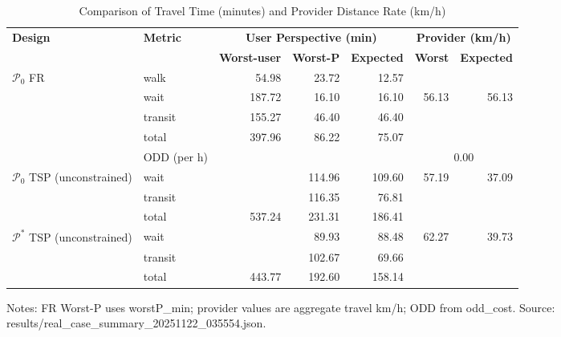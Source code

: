 \begin{table}[t]
\centering
\caption{Comparison of Travel Time (minutes) and Provider Distance Rate (km/h)}
\begin{tabular}{l l r r r r r}
\toprule
\textbf{Design} & \textbf{Metric} & 
\multicolumn{3}{c}{\textbf{User Perspective (min)}} & 
\multicolumn{2}{c}{\textbf{Provider (km/h)}} \\
\cmidrule(lr){3-5}\cmidrule(lr){6-7}
& & \textbf{Worst-user} & \textbf{Worst-P} & \textbf{Expected} & \textbf{Worst} & \textbf{Expected} \\
\midrule
$\mathcal{P}_0$ FR & walk    & 54.98 & 23.72 & 12.57 &        &        \\
                   & wait    & 187.72 & 16.10 & 16.10 & 56.13  & 56.13  \\
                   & transit & 155.27 & 46.40 & 46.40 &        &        \\
                   & total   & 397.96 & 86.22 & 75.07 &       &        \\
                   & ODD (per h) &  &  &  & \multicolumn{2}{c}{0.00} \\
\midrule
$\mathcal{P}_0$ TSP (unconstrained) & wait    &  & 114.96 & 109.60 & 57.19 & 37.09 \\
                                    & transit &  & 116.35 & 76.81 &        &       \\
                                    & total   & 537.24 & 231.31 & 186.41 &        &       \\
\midrule
$\mathcal{P}^*$ TSP (unconstrained) & wait    &  & 89.93 & 88.48 & 62.27 & 39.73 \\
                                    & transit &  & 102.67 & 69.66 &        &       \\
                                    & total   & 443.77 & 192.60 & 158.14 &        &       \\
\bottomrule
\end{tabular}

\vspace{0.5ex}
\small
Notes: FR Worst-P uses worstP\_min; provider values are aggregate travel km/h; ODD from odd\_cost. Source: results/real_case_summary_20251122_035554.json.
\end{table}